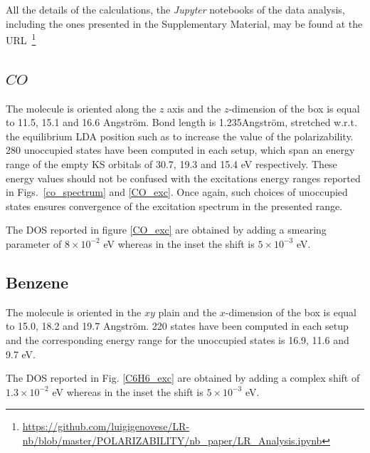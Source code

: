 \documentclass[reprint,aps,prb]{revtex4-1}
\renewcommand{\AA}{{Angstr\"om}}
\begin{document}
All the details of the calculations, the \textsl{Jupyter} notebooks of the data analysis, including the ones presented in the Supplementary Material, may be found at the URL~\footnote{\protect\url{https://github.com/luigigenovese/LR-nb/blob/master/POLARIZABILITY/nb_paper/LR_Analysis.ipynb}}

\subsection{$CO$}
The molecule is oriented along the $z$ axis and the $z$-dimension of the box is equal to 11.5, 15.1 and 16.6 \AA.
Bond length is 1.235\AA, stretched w.r.t. the equilibrium LDA position such as to increase the value of the polarizability.
280 unoccupied states have been computed in each setup, which span an energy range of the empty KS orbitals of 30.7, 19.3 and 15.4 eV respectively.
These energy values should not be confused with the excitations energy ranges reported in Figs.~\ref{co_spectrum} and \ref{CO_exc}.
Once again, such choices of unoccupied states ensures convergence of the excitation spectrum in the presented range.

The DOS reported in figure \ref{CO_exc} are obtained by adding a smearing parameter of $8\times 10^{-2}$ eV whereas in the inset the shift is $5\times 10^{-3}$ eV.

\subsection{Benzene}
The molecule is oriented in the $xy$ plain and the $x$-dimension of the box is equal to 15.0, 18.2 and 19.7 \AA.
220 states have been computed in each setup and the corresponding
energy range for the unoccupied states is 16.9, 11.6 and 9.7 eV.

The DOS reported in Fig. \ref{C6H6_exc} are obtained by adding a complex shift of $1.3\times 10^{-2}$ eV whereas in the inset the shift is $5\times 10^{-3}$ eV.
\end{document}
